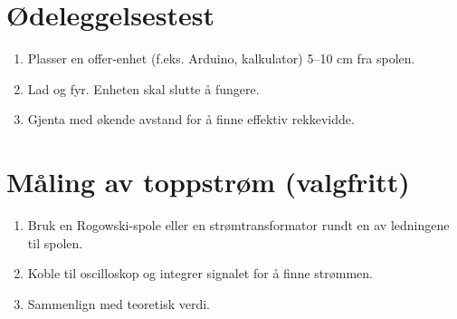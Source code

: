 \documentclass{article}
\begin{document}
\section{Ødeleggelsestest}
\begin{enumerate}
\item Plasser en offer-enhet (f.eks. Arduino, kalkulator) 5–10 cm fra spolen.
\item Lad og fyr. Enheten skal slutte å fungere.
\item Gjenta med økende avstand for å finne effektiv rekkevidde.
\end{enumerate}

\section{Måling av toppstrøm (valgfritt)}
\begin{enumerate}
\item Bruk en Rogowski-spole eller en strømtransformator rundt en av ledningene til spolen.
\item Koble til oscilloskop og integrer signalet for å finne strømmen.
\item Sammenlign med teoretisk verdi.
\end{enumerate}
\end{document}
